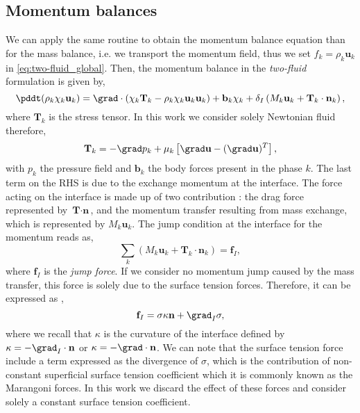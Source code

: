 \subsection{Momentum balances}

We can apply the same routine to obtain the momentum balance equation than for the mass balance, i.e. we transport the momentum field, thus we set $f_k = \rho_k \textbf{u}_k$ in \ref{eq:two-fluid_global}.
Then, the momentum balance in the \textit{two-fluid} formulation is given by,
\begin{equation}
    \pddt (\rho_k \chi_k \textbf{u}_k)
    = \grad \cdot \left(
        \chi_k\textbf{T}_k 
        -\rho_k \chi_k \textbf{u}_k \textbf{u}_k 
    \right) 
    + \textbf{b}_k\chi_k
    +  \delta_I\left(
        M_k \textbf{u}_k
        + \textbf{T}_k \cdot \textbf{n}_k 
    \right),
    \label{eq:two-fuild_momentum}
\end{equation}
where $\textbf{T}_k$ is the stress tensor.
In this work we consider solely Newtonian fluid therefore,
\begin{equation*}
    \textbf{T}_k 
    = -\grad p_k 
    + \mu_k \left[\grad \textbf{u} - (\grad\textbf{u})^T\right],
\end{equation*}
with $p_k$ the pressure field and $\textbf{b}_k$ the body forces present in the phase $k$.
The last term on the RHS is due to the exchange momentum at the interface.
The force acting on the interface is made up of two contribution : the drag force represented by $\textbf{T}\cdot\textbf{n}$, and the momentum transfer resulting from mass exchange, which is represented by $M_k \textbf{u}_k$.
The jump condition at the interface for the momentum reads as, 
\begin{equation*}
    \sum_k \left(
        M_k \textbf{u}_k
        + \textbf{T}_k \cdot \textbf{n}_k
    \right)
    = \textbf{f}_I,
    \label{eq:stressjump}
\end{equation*}
where $\textbf{f}_I$ is the \textit{jump force}. 
If we consider no momentum jump caused by the mass transfer, this force is solely due to the surface tension forces. 
Therefore, it can be expressed as \citep{tryggvason2011direct},  
\begin{equation}
    \textbf{f}_I    
    = \sigma \kappa \textbf{n}
    +\grad_I \sigma,
    \label{eq:f_I}
\end{equation}
where we recall that $\kappa$ is the curvature of the interface defined by $\kappa = -\grad_I\cdot\textbf{n}$ or $\kappa = -\grad\cdot\textbf{n}$. 
We can note that the surface tension force include a term expressed as the divergence of $\sigma$, which is the contribution of non-constant superficial surface tension coefficient which it is commonly known as the  Marangoni forces.
In this work we discard the effect of these forces and consider solely a constant surface tension coefficient.  

